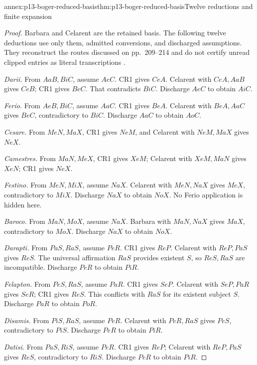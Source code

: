 \begin{annexitem}{annex:p13-boger-reduced-basis}{thm:p13-boger-reduced-basis}{Twelve reductions and finite expansion}
\begin{proof}
Barbara and Celarent are the retained basis. The following twelve deductions
use only them, admitted conversions, and discharged assumptions. They
reconstruct the routes discussed on pp.~209--214 and do not certify
unread clipped entries as literal transcriptions
\parencite{Boger2004UnderlyingLogic}.

\emph{Darii.} From \(AaB,BiC\), assume \(AeC\). CR1 gives \(CeA\).
Celarent with \(CeA,AaB\) gives \(CeB\); CR1 gives \(BeC\).
That contradicts \(BiC\). Discharge \(AeC\) to obtain \(AiC\).

\emph{Ferio.} From \(AeB,BiC\), assume \(AaC\). CR1 gives \(BeA\).
Celarent with \(BeA,AaC\) gives \(BeC\), contradictory to \(BiC\).
Discharge \(AaC\) to obtain \(AoC\).

\emph{Cesare.} From \(MeN,MaX\), CR1 gives \(NeM\), and Celarent
with \(NeM,MaX\) gives \(NeX\).

\emph{Camestres.} From \(MaN,MeX\), CR1 gives \(XeM\); Celarent
with \(XeM,MaN\) gives \(XeN\); CR1 gives \(NeX\).

\emph{Festino.} From \(MeN,MiX\), assume \(NaX\).
Celarent with \(MeN,NaX\) gives \(MeX\), contradictory to \(MiX\).
Discharge \(NaX\) to obtain \(NoX\). No Ferio application is hidden here.

\emph{Baroco.} From \(MaN,MoX\), assume \(NaX\).
Barbara with \(MaN,NaX\) gives \(MaX\), contradictory to \(MoX\).
Discharge \(NaX\) to obtain \(NoX\).

\emph{Darapti.} From \(PaS,RaS\), assume \(PeR\).
CR1 gives \(ReP\). Celarent with \(ReP,PaS\) gives \(ReS\).
The universal affirmation \(RaS\) provides existent \(S\), so
\(ReS,RaS\) are incompatible. Discharge \(PeR\) to obtain \(PiR\).

\emph{Felapton.} From \(PeS,RaS\), assume \(PaR\).
CR1 gives \(SeP\). Celarent with \(SeP,PaR\) gives \(SeR\);
CR1 gives \(ReS\). This conflicts with \(RaS\) for its existent
subject \(S\). Discharge \(PaR\) to obtain \(PoR\).

\emph{Disamis.} From \(PiS,RaS\), assume \(PeR\).
Celarent with \(PeR,RaS\) gives \(PeS\), contradictory to \(PiS\).
Discharge \(PeR\) to obtain \(PiR\).

\emph{Datisi.} From \(PaS,RiS\), assume \(PeR\).
CR1 gives \(ReP\); Celarent with \(ReP,PaS\) gives \(ReS\),
contradictory to \(RiS\). Discharge \(PeR\) to obtain \(PiR\).


\end{proof}
\end{annexitem}
